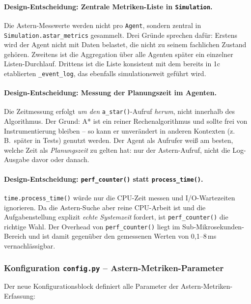\paragraph{Design-Entscheidung: Zentrale Metriken-Liste in \texttt{Simulation}.}
Die \acs{Astern}-Messwerte werden nicht pro \texttt{Agent}, sondern zentral in \texttt{Simulation.astar\_metrics} gesammelt. Drei Gründe sprechen dafür: Erstens wird der Agent nicht mit Daten belastet, die nicht zu seinem fachlichen Zustand gehören. Zweitens ist die Aggregation über alle Agenten später ein einzelner Listen-Durchlauf. Drittens ist die Liste konsistent mit dem bereits in 1c etablierten \texttt{\_event\_log}, das ebenfalls simulationsweit geführt wird.

\paragraph{Design-Entscheidung: Messung der Planungszeit im Agenten.}
Die Zeitmessung erfolgt \textit{um den} \texttt{a\_star()}-Aufruf \textit{herum}, nicht innerhalb des Algorithmus. Der Grund: A* ist ein reiner Rechenalgorithmus und sollte frei von Instrumentierung bleiben -- so kann er unverändert in anderen Kontexten (z.\,B.\ später in Tests) genutzt werden. Der Agent als Aufrufer weiß am besten, welche Zeit als \textit{Planungszeit} zu gelten hat: nur der \acs{Astern}-Aufruf, nicht die Log-Ausgabe davor oder danach.

\paragraph{Design-Entscheidung: \texttt{perf\_counter()} statt \texttt{process\_time()}.}
\texttt{time.process\_time()} würde nur die CPU-Zeit messen und I/O-Wartezeiten ignorieren. Da die \acs{Astern}-Suche aber reine CPU-Arbeit ist und die Aufgabenstellung explizit \textit{echte Systemzeit} fordert, ist \texttt{perf\_counter()} die richtige Wahl. Der Overhead von \texttt{perf\_counter()} liegt im Sub-Mikrosekunden-Bereich und ist damit gegenüber den gemessenen Werten von 0{,}1--8\,ms vernachlässigbar.


\subsubsection{Konfiguration \texttt{config.py} – \acs{Astern}-Metriken-Parameter}

Der neue Konfigurationsblock definiert alle Parameter der \acs{Astern}-Metriken-Erfassung:

